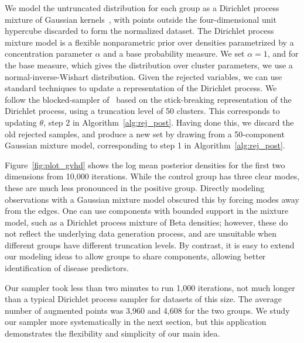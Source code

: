 We model the untruncated distribution for each group as a Dirichlet process mixture of Gaussian kernels~\citep{Lo1984}, with points
outside the four-dimensional unit hypercube discarded to form the normalized dataset.
The Dirichlet process mixture model is a flexible nonparametric prior over densities %
parametrized by a concentration parameter $\alpha$ and a base probability measure.
We set $\alpha = 1$, and for the base measure, which gives the distribution over cluster parameters, we use a normal-inverse-Wishart distribution. 
Given the rejected variables, we can use standard techniques to update a representation of the Dirichlet process. 
We follow the blocked-sampler of~\cite{IshJam2001} based on the stick-breaking representation of the Dirichlet process, using a truncation level of 
50 clusters. 
This corresponds to updating $\theta$, step 2 in Algorithm~\ref{alg:rej_post}. 
Having done this, we discard the old rejected samples, and produce a new set by drawing from a 50-component Gaussian mixture 
model, corresponding to step 1 in Algorithm~\ref{alg:rej_post}.

Figure~\ref{fig:plot_gvhd} shows the log mean posterior densities for the first two dimensions from 10,000 iterations. %
While the control group has three clear modes, these are much less pronounced in the positive group.
Directly modeling observations with a Gaussian mixture model obscured this by forcing modes away from the edges. 
One can use components with bounded support in the mixture model, such as a Dirichlet process mixture of Beta densities; however, these do not reflect the 
underlying data generation process, and are unsuitable when different groups have different
truncation levels. By contrast, it is easy to extend our modeling ideas to allow groups to share
components, allowing better identification of disease predictors.

Our sampler took less than two minutes to run 1,000 iterations, not much longer than a typical Dirichlet process sampler for 
datasets of this size. The average number of augmented points was 3,960 and 4,608 for the two groups. We study our  sampler more systematically 
in the next section, but this application demonstrates the flexibility and simplicity of our main idea.




